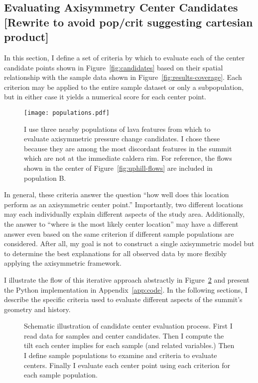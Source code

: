 \subsection{Evaluating Axisymmetry Center Candidates [Rewrite to avoid pop/crit suggesting cartesian product]}

In this section, I define a set of criteria by which to evaluate each of the center candidate points shown in Figure~\ref{fig:candidates} based on their spatial relationship with the sample data shown in Figure~\ref{fig:results-coverage}. Each criterion may be applied to the entire sample dataset or only a subpopulation, but in either case it yields a numerical score for each center point.

\begin{figure}
    \texttt{[image: populations.pdf]}%
    \caption[Sample Populations for Inflation Center Evaluation]{I use three nearby populations of lava features from which to evaluate axisymmetric pressure change candidates. I chose these because they are among the most discordant features in the summit which are not at the immediate caldera rim. For reference, the flows shown in the center of Figure~\ref{fig:uphill-flows} are included in population B.}%
    \label{fig:populations}
\end{figure}

In general, these criteria answer the question ``how well does this location perform as an axisymmetric center point.'' Importantly, two different locations may each individually explain different aspects of the study area. Additionally, the answer to ``where is the most likely center location'' may have a different answer even based on the same criterion if different sample populations are considered. After all, my goal is not to construct a single axisymmetric model but to determine the best explanations for all observed data by more flexibly applying the axisymmetric framework.

I illustrate the flow of this iterative approach abstractly in Figure~\ref{fig:eval-model} and present the Python implementation in Appendix~\ref{app:code}. In the following sections, I describe the specific criteria used to evaluate different aspects of the summit's geometry and history.

\begin{figure}
    \caption[Center evaluation workflow]{Schematic illustration of candidate center evaluation process. First I read data for samples and center candidates. Then I compute the tilt each center implies for each sample (and related variables.) Then I define sample populations to examine and criteria to evaluate centers. Finally I evaluate each center point using each criterion for each sample population.}%
    \label{fig:eval-model}
\end{figure}

